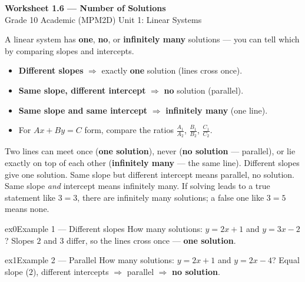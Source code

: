 \documentclass[11pt]{article}
\begin{document}
\begin{center}
{\LARGE\bfseries\color{titleblue}Worksheet 1.6 --- Number of Solutions}\\[2pt]
{\small Grade 10 Academic (MPM2D) \textperiodcentered{} Unit 1: Linear Systems}
\end{center}

\begin{ideabox}
A linear system has \textbf{one}, \textbf{no}, or \textbf{infinitely many} solutions --- you can tell which by comparing slopes and intercepts.
\begin{itemize}[leftmargin=*,itemsep=2pt]
  \item \textbf{Different slopes} $\Rightarrow$ exactly \textbf{one} solution (lines cross once).
  \item \textbf{Same slope, different intercept} $\Rightarrow$ \textbf{no} solution (parallel).
  \item \textbf{Same slope and same intercept} $\Rightarrow$ \textbf{infinitely many} (one line).
  \item For $Ax+By=C$ form, compare the ratios $\tfrac{A_1}{A_2}$, $\tfrac{B_1}{B_2}$, $\tfrac{C_1}{C_2}$.
\end{itemize}
\end{ideabox}

\begin{learnbox}
Two lines can meet once (\textbf{one solution}), never (\textbf{no solution} — parallel), or lie exactly on top of each other (\textbf{infinitely many} — the same line).
Different slopes give one solution. Same slope but different intercept means parallel, no solution. Same slope \emph{and} intercept means infinitely many.
If solving leads to a true statement like $3=3$, there are infinitely many solutions; a false one like $3=5$ means none.
\end{learnbox}


\begin{example}{ex0}{Example 1 --- Different slopes}
How many solutions: $y=2x+1$ and $y=3x-2$?
\soln Slopes $2$ and $3$ differ, so the lines cross once --- \textbf{one solution}.
\end{example}

\begin{example}{ex1}{Example 2 --- Parallel}
How many solutions: $y=2x+1$ and $y=2x-4$?
\soln Equal slope ($2$), different intercepts $\Rightarrow$ parallel $\Rightarrow$ \textbf{no solution}.
\end{example}
\end{document}
